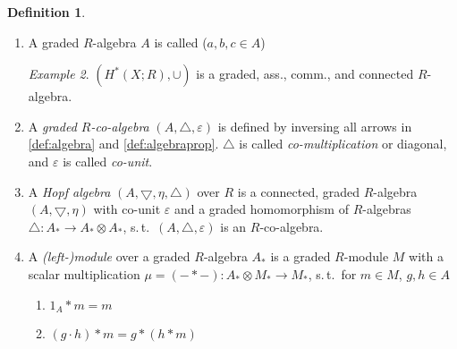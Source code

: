 \documentclass[english]{scrartcl}
\theoremstyle{definition}
\newtheorem*{Def}{Definition}
\theoremstyle{remark}
\newtheorem*{Ex}{Example}
\newcommand*{\suchthat}{s.\,t.\ }
\newcommand*{\mult}{\bigtriangledown} %
\newcommand*{\comult}{\bigtriangleup} %
\newcommand*{\unit}{\eta} %
\newcommand*{\counit}{\varepsilon} %
\newcommand*{\multmod}{\mu} %
\newcommand*{\m}{*} %
\newcommand*{\one}[1]{1_{#1}} %
\begin{document}
\begin{Def}
\begin{enumerate}[label=(\arabic*), parsep=0pt, listparindent=\parindent]
    \begin{Ex}
      $(A_*\otimes B_*, \mult_{A\otimes B},\unit_A\otimes\unit_B)$
      is a graded $R$-algebra with multiplication
      \begin{gather*}
      (a_1\otimes b_1)\cdot(a_2\otimes b_2)\coloneqq 
      (-1)^{\deg(b_1)\deg(a_2)} (a_1\cdot a_2)\otimes(b_1\cdot b_2)\;.
    \end{gather*}
  \end{Ex}
  \item\label{def:algebraprop} A graded $R$-algebra $A$ is called ($a,b,c\in A$)
    
    \begin{Ex}
      $(H^*(X;R),\cup)$ is a graded, ass., comm., and
      connected $R$-algebra.
    \end{Ex}
  \item A \emph{graded $R$-co-algebra} $(A,\comult,\counit)$ is defined by
    inversing all arrows in \ref{def:algebra} and \ref{def:algebraprop}.
    $\comult$ is called \emph{co-multiplication} or diagonal, and $\counit$
    is called \emph{co-unit}.
  \item A \emph{Hopf algebra} $(A,\mult,\unit,\comult)$ over $R$ is a
    connected, graded $R$-algebra $(A,\mult,\unit)$ with co-unit
    $\counit$ and a graded homomorphism of $R$-algebras
    $\comult\colon A_*\to A_*\otimes A_*$,
    \suchthat $(A,\comult,\counit)$ is an $R$-co-algebra.
  \item A \emph{(left-)module} over a graded $R$-algebra $A_*$ is
    a graded $R$-module $M$ with a scalar multiplication
    $\multmod=(-\m-)\colon A_*\otimes M_*\to M_*$,
    \suchthat for $m\in M$, $g,h\in A$
    \begin{enumerate}
    \item $\one{A}\m m = m$
    \item $(g\cdot h)\m m = g\m(h\m m)$
    \end{enumerate}
  \end{enumerate}
\end{Def}
\end{document}
